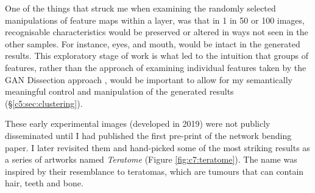 One of the things that struck me when examining the randomly selected manipulations of feature maps within a layer, was that in 1 in 50 or 100 images, recognisable characteristics would be preserved or altered in ways not seen in the other samples. 
For instance, eyes, and mouth, would be intact in the generated results. This exploratory stage of work is what led to the intuition that groups of features, rather than the approach of examining individual features taken by the GAN Dissection approach \citep{bau2019semantic}, would be important to allow for my semantically meaningful control and manipulation of the generated results (\S \ref{c5:sec:clustering}). 

These early experimental images (developed in 2019) were not publicly disseminated until I had published the first pre-print of the network bending paper.
I later revisited them and hand-picked some of the most striking results as a series of artworks named \textit{Teratome} \citeyearpar{broad2020teratome} (Figure \ref{fig:c7:teratome}). 
The name was inspired by their resemblance to teratomas, which are tumours that can contain hair, teeth and bone. 

